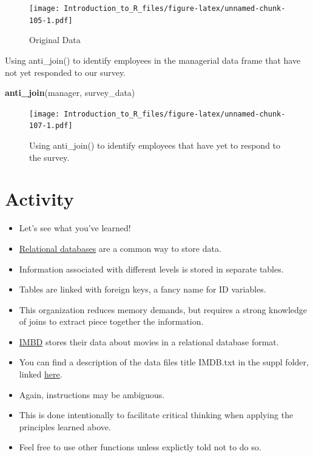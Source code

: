 \documentclass[]{book}
\newenvironment{Shaded}{\begin{snugshade}}{\end{snugshade}}
\newcommand{\KeywordTok}[1]{\textcolor[rgb]{0.13,0.29,0.53}{\textbf{#1}}}
\newcommand{\NormalTok}[1]{#1}
\providecommand{\tightlist}{%
  \setlength{\itemsep}{0pt}\setlength{\parskip}{0pt}}
\theoremstyle{definition}
\theoremstyle{definition}
\theoremstyle{definition}
\theoremstyle{remark}
\let\BeginKnitrBlock\begin \let\EndKnitrBlock\end
\begin{document}
\begin{figure}
\centering
\texttt{[image: Introduction\_to\_R\_files/figure-latex/unnamed-chunk-105-1.pdf]}
\caption{\label{fig:unnamed-chunk-105}Original Data}
\end{figure}

\BeginKnitrBlock{example}
\protect\hypertarget{exm:antijoin1}{}{\label{exm:antijoin1} }Using anti\_join() to identify employees in the managerial data frame that have not yet responded to our survey.
\EndKnitrBlock{example}

\begin{Shaded}
\begin{Highlighting}[]
\KeywordTok{anti_join}\NormalTok{(manager, survey_data)}
\end{Highlighting}
\end{Shaded}

\begin{figure}
\centering
\texttt{[image: Introduction\_to\_R\_files/figure-latex/unnamed-chunk-107-1.pdf]}
\caption{\label{fig:unnamed-chunk-107}Using anti\_join() to identify employees that have yet to respond to the survey.}
\end{figure}

\hypertarget{activity-1}{%
\chapter{Activity}\label{activity-1}}

\begin{itemize}
\tightlist
\item
  Let's see what you've learned!
\item
  \href{https://en.wikipedia.org/wiki/Relational_database}{Relational databases} are a common way to store data.
\item
  Information associated with different levels is stored in separate tables.
\item
  Tables are linked with foreign keys, a fancy name for ID variables.
\item
  This organization reduces memory demands, but requires a strong knowledge of joins to extract piece together the information.
\item
  \href{https://www.imdb.com/}{IMBD} stores their data about movies in a relational database format.
\item
  You can find a description of the data files title IMDB.txt in the suppl folder, linked \href{https://github.com/jimmyrigby94/Data-Management-in-R/tree/master/suppl}{here}.
\item
  Again, instructions may be ambiguous.
\item
  This is done intentionally to facilitate critical thinking when applying the principles learned above.
\item
  Feel free to use other functions unless explictly told not to do so.
\end{itemize}
\end{document}
